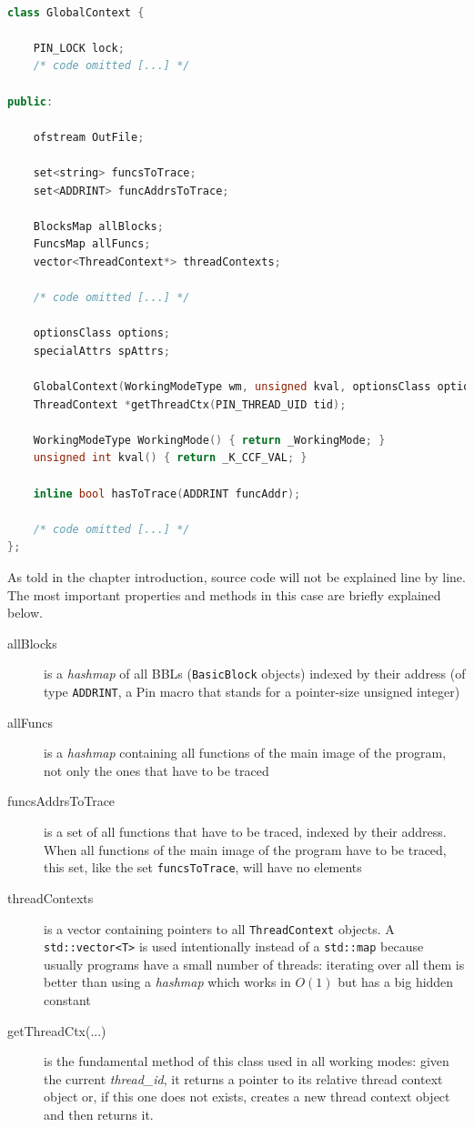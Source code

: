 \documentclass[a4paper,10pt]{report}
\begin{document}
\begin{lstlisting}[language=C++, 
	caption={partial definition of \texttt{GlobalContext}}, label=globalCtx, frame=leftline]

class GlobalContext {
	
	PIN_LOCK lock;
	/* code omitted [...] */

public:

	ofstream OutFile;

	set<string> funcsToTrace;
	set<ADDRINT> funcAddrsToTrace;

	BlocksMap allBlocks;
	FuncsMap allFuncs;
	vector<ThreadContext*> threadContexts;

	/* code omitted [...] */

	optionsClass options;
	specialAttrs spAttrs;

	GlobalContext(WorkingModeType wm, unsigned kval, optionsClass options);
	ThreadContext *getThreadCtx(PIN_THREAD_UID tid);

	WorkingModeType WorkingMode() { return _WorkingMode; }
	unsigned int kval() { return _K_CCF_VAL; }

	inline bool hasToTrace(ADDRINT funcAddr);

	/* code omitted [...] */
};

\end{lstlisting}

\noindent
As told in the chapter introduction, source code will not be explained line by line.
The most important properties and methods in this case are briefly explained below.
\begin{description}
\item[allBlocks] is a \emph{hashmap} of all BBLs (\verb|BasicBlock| objects) indexed by their address (of type \verb|ADDRINT|, a Pin macro that stands for a pointer-size unsigned integer)
\item[allFuncs] is a \emph{hashmap} containing all functions of the main image of the
program, not only the ones that have to be traced
\item[funcsAddrsToTrace] is a set of all functions that have to be traced, indexed 
by their address. When all functions of the main image of the program have to be traced,
this set, like the set \verb|funcsToTrace|, will have no elements
\item[threadContexts] is a vector containing pointers to all \verb|ThreadContext| objects. A \verb|std::vector<T>| is used intentionally instead of a \verb|std::map| because
usually programs have a small number of threads: iterating over all them is better than using a \emph{hashmap} which works in $O(1)$ but has a big hidden constant
\item[getThreadCtx(...)] is the fundamental method of this class used in all working modes:
given the current \emph{thread\_id}, it returns a pointer to its relative thread context object or, if this one does not exists, creates a new thread context object and then returns it.
\end{description}
\end{document}
